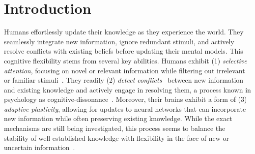 \section{Introduction}\label{sec:intro}
Humans effortlessly update their knowledge as they experience the world. They seamlessly integrate new information, ignore redundant stimuli, and actively resolve conflicts with existing beliefs before updating their mental models. This cognitive flexibility stems from several key abilities. Humans exhibit (1) \textit{selective attention}, focusing on novel or relevant information while filtering out irrelevant or familiar stimuli~\citep{posner1990attention, petersen2012attention, desimone1995neural, ranganath2003neural}.
They readily (2) \textit{detect conflicts}~\citep{croyle1983dissonance} between new information and existing knowledge and actively engage in resolving them, a process known in psychology as cognitive-dissonance~\citep{festinger1957theory, van2009neural}. Moreover, their brains exhibit a form of (3) \textit{adaptive plasticity}, allowing for updates to neural networks that can incorporate new information while often preserving existing knowledge. 
While the exact mechanisms are still being investigated, this process seems to balance the stability of well-established knowledge with flexibility in the face of new or uncertain information~\citep{mcclelland1995there,behrens2007learning}.


